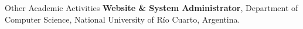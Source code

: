 \begin{rubric}{Other Academic Activities}
\entry*[2025 -- Present]
\textbf{Website \& System Administrator}, Department of Computer Science, National University of Río Cuarto, Argentina.
\end{rubric}